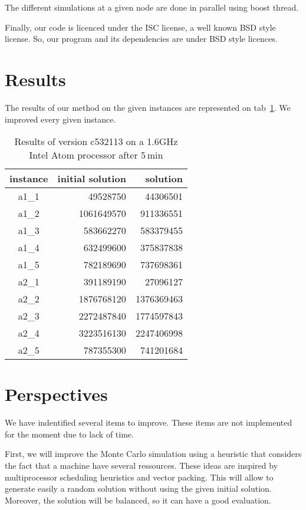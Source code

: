 \documentclass[a4paper,twocolumn]{article}
\begin{document}
The different simulations at a given node are done in parallel using
boost thread.

Finally, our code is licenced under the ISC license, a well known BSD
style license.  So, our program and its dependencies are under BSD
style licences.

\section{Results}

The results of our method on the given instances are represented on
tab~\ref{tab:results}.  We improved every given instance.

\begin{table}
  \centering
  \label{tab:results}
  \caption{Results of version c532113 on a 1.6GHz Intel Atom processor
    after 5\,min}
  \begin{tabular}{|c|r|r|}
    \hline
    instance & initial solution & solution\\
    \hline
    a1\_1 &   49528750 &   44306501\\
    a1\_2 & 1061649570 &  911336551\\
    a1\_3 &  583662270 &  583379455\\
    a1\_4 &  632499600 &  375837838\\
    a1\_5 &  782189690 &  737698361\\
    a2\_1 &  391189190 &   27096127\\
    a2\_2 & 1876768120 & 1376369463\\
    a2\_3 & 2272487840 & 1774597843\\
    a2\_4 & 3223516130 & 2247406998\\
    a2\_5 &  787355300 &  741201684\\
    \hline
  \end{tabular}
\end{table}

\section{Perspectives}

We have indentified several items to improve. These items are not
implemented for the moment due to lack of time.

First, we will improve the Monte Carlo simulation using a heuristic
that considers the fact that a machine have several
ressources.  These ideas are inspired by multiprocessor scheduling
heuristics and vector packing.  This will allow to generate easily a
random solution without using the given initial solution. Moreover,
the solution will be balanced, so it can have a good evaluation.
\end{document}
